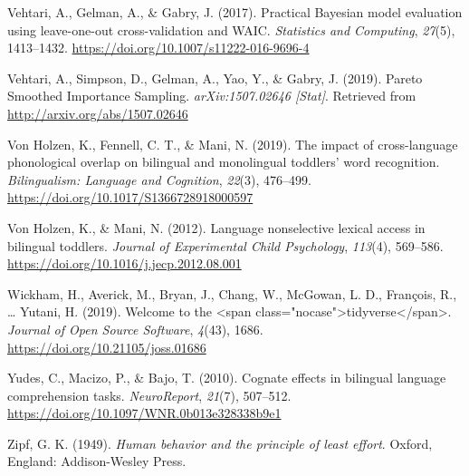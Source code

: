 \documentclass[english,man,man,floatsintext]{apa6}
\begin{document}
\leavevmode\hypertarget{ref-vehtari2017}{}%
Vehtari, A., Gelman, A., \& Gabry, J. (2017). Practical Bayesian model evaluation using leave-one-out cross-validation and WAIC. \emph{Statistics and Computing}, \emph{27}(5), 1413--1432. \url{https://doi.org/10.1007/s11222-016-9696-4}

\leavevmode\hypertarget{ref-vehtari2019}{}%
Vehtari, A., Simpson, D., Gelman, A., Yao, Y., \& Gabry, J. (2019). Pareto Smoothed Importance Sampling. \emph{arXiv:1507.02646 {[}Stat{]}}. Retrieved from \url{http://arxiv.org/abs/1507.02646}

\leavevmode\hypertarget{ref-vonholzen2019}{}%
Von Holzen, K., Fennell, C. T., \& Mani, N. (2019). The impact of cross-language phonological overlap on bilingual and monolingual toddlers' word recognition. \emph{Bilingualism: Language and Cognition}, \emph{22}(3), 476--499. \url{https://doi.org/10.1017/S1366728918000597}

\leavevmode\hypertarget{ref-vonholzen2012}{}%
Von Holzen, K., \& Mani, N. (2012). Language nonselective lexical access in bilingual toddlers. \emph{Journal of Experimental Child Psychology}, \emph{113}(4), 569--586. \url{https://doi.org/10.1016/j.jecp.2012.08.001}

\leavevmode\hypertarget{ref-wickham2019}{}%
Wickham, H., Averick, M., Bryan, J., Chang, W., McGowan, L. D., François, R., \ldots{} Yutani, H. (2019). Welcome to the \textless{}span class="nocase"\textgreater{}tidyverse\textless{}/span\textgreater{}. \emph{Journal of Open Source Software}, \emph{4}(43), 1686. \url{https://doi.org/10.21105/joss.01686}

\leavevmode\hypertarget{ref-yudes2010}{}%
Yudes, C., Macizo, P., \& Bajo, T. (2010). Cognate effects in bilingual language comprehension tasks. \emph{NeuroReport}, \emph{21}(7), 507--512. \url{https://doi.org/10.1097/WNR.0b013e328338b9e1}

\leavevmode\hypertarget{ref-zipf1949}{}%
Zipf, G. K. (1949). \emph{Human behavior and the principle of least effort}. Oxford, England: Addison-Wesley Press.

\endgroup
\end{document}
